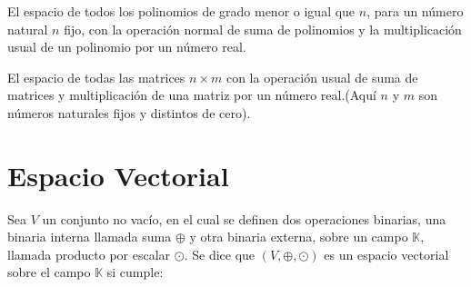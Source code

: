 \begin{ejemplo}
El espacio de todos los polinomios de grado menor o igual que $n$, para un número natural $n$ fijo, con la operación normal de suma de polinomios y la multiplicación usual de un polinomio por un número real.
\end{ejemplo}

\begin{ejemplo}
El espacio de todas las matrices $n \times m$ con la operación usual de suma de matrices y multiplicación de una matriz por un número real.(Aquí $n$ y $m$ son números naturales fijos y distintos de cero).


\end{ejemplo}





\section{Espacio Vectorial}
\begin{dfn}
Sea $V$ un conjunto no vac\'io, en el cual se definen dos operaciones binarias, una binaria interna llamada suma $\oplus$ y otra binaria externa, sobre un campo $\mathbb{K}$, llamada producto por escalar $\odot$. Se dice que $\left( V,\oplus ,\odot \right) $ es un espacio vectorial sobre el campo $\mathbb{K}$ si cumple:
\end{dfn}

